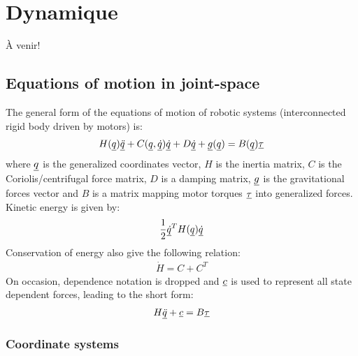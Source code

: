 \chapter{Dynamique}

À venir!



\section{Equations of motion in joint-space}
\label{sec:eom}

The general form of the equations of motion of robotic systems (interconnected rigid body driven by motors) is:
%
\begin{align}
H(\underline{q}) \underline{\ddot{q}} + C(\underline{q},\underline{\dot{q}}) \underline{\dot{q}} + D \underline{\dot{q}} + \underline{g}(\underline{q}) = B(\underline{q}) \underline{\tau} 
\label{eq:manipulator}
\end{align}
%
where $\underline{q}$ is the generalized coordinates vector, $H$ is the inertia matrix, $C$ is the Coriolis/centrifugal force matrix, $D$ is a damping matrix, $\underline{g}$ is the gravitational forces vector and $B$ is a matrix mapping motor torques $\underline{\tau}$ into generalized forces.
%
Kinetic energy is given by:
%
\begin{align}
\frac{1}{2} \underline{\dot{q}}^T H(\underline{q}) \underline{\dot{q}} 
\label{eq:kinetic}
\end{align}
%
Conservation of energy also give the following relation:
%
\begin{align}
\dot{H} = C + C^T
\label{eq:cener}
\end{align}
%
On occasion, dependence notation is dropped and $\underline{c}$ is used to represent all state dependent forces, leading to the short form:
%
\begin{align}
H \underline{\ddot{q}} + \underline{c} = B \underline{\tau} 
\label{eq:manipulator_short}
\end{align}

\subsection{Coordinate systems}
\label{sec:coord}

